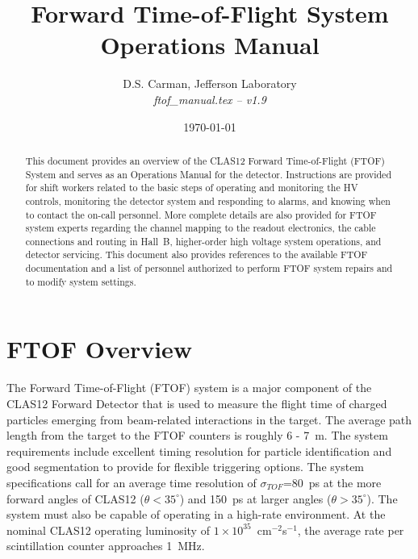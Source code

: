 \documentclass[12pt]{article}
\begin{document}
\title{Forward Time-of-Flight System Operations Manual}

\vskip 0.5cm

\author{D.S. Carman, Jefferson Laboratory\\[0.2ex]
{\it ftof\_manual.tex -- v1.9}}

\date \today
%
\maketitle

\begin{abstract}
This document provides an overview of the CLAS12 Forward Time-of-Flight (FTOF) System 
and serves as an Operations Manual for the detector. Instructions are provided for 
shift workers related to the basic steps of operating and monitoring the HV controls, 
monitoring the detector system and responding to alarms, and knowing when to contact 
the on-call personnel. More complete details are also provided for FTOF system experts 
regarding the channel mapping to the readout electronics, the cable connections and 
routing in Hall~B, higher-order high voltage system operations, and detector servicing. 
This document also provides references to the available FTOF documentation and a list 
of personnel authorized to perform FTOF system repairs and to modify system settings.
\end{abstract}

\thispagestyle{empty}

\clearpage

\vfil
\eject

\tableofcontents

\vfil
\eject

\section{FTOF Overview}
\label{intro}

The Forward Time-of-Flight (FTOF) system is a major component of the CLAS12 Forward 
Detector that is used to measure the flight time of charged particles emerging from 
beam-related interactions in the target. The average path length from the target to 
the FTOF counters is roughly 6 - 7~m. The system requirements include excellent timing 
resolution for particle identification and good segmentation to provide for flexible 
triggering options. The system specifications call for an average time resolution of 
$\sigma_{TOF}$=80~ps at the more forward angles of CLAS12 ($\theta < 35^\circ$) and 
150~ps at larger angles ($\theta > 35^\circ$). The system must also be capable of 
operating in a high-rate environment. At the nominal CLAS12 operating luminosity of 
$1 \times 10^{35}$~cm$^{-2}$s$^{-1}$, the average rate per scintillation counter approaches
1~MHz.
\end{document}
